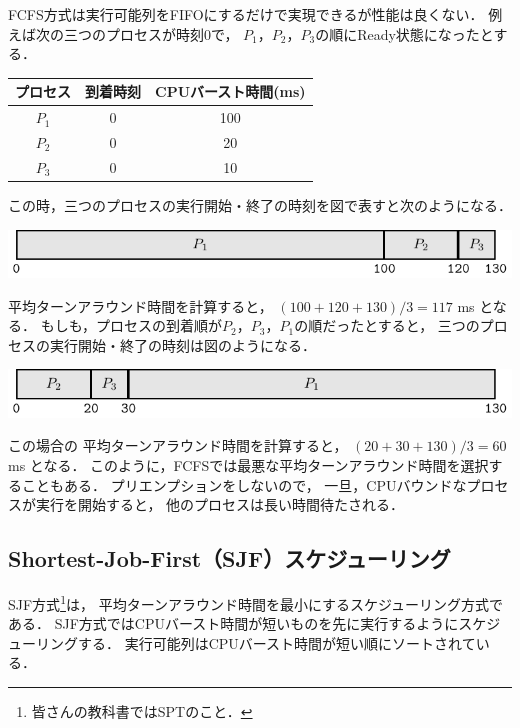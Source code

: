 FCFS方式は実行可能列をFIFOにするだけで実現できるが性能は良くない．
例えば次の三つのプロセスが時刻0で，
$P_1$，$P_2$，$P_3$の順にReady状態になったとする．

\begin{center}
\begin{tabular}{c c c}
プロセス & 到着時刻 & CPUバースト時間(ms) \\
\hline
$P_1$    & 0 & 100 \\
$P_2$    & 0 & 20 \\
$P_3$    & 0 & 10 \\
\end{tabular}
\end{center}

この時，三つのプロセスの実行開始・終了の時刻を図で表すと次のようになる．

\begin{center}
\includegraphics[scale=1.0]{GanntChart/fcfs1.pdf}
\end{center}

平均ターンアラウンド時間を計算すると，
$(100+120+130) / 3 = 117$ ms となる．
もしも，プロセスの到着順が$P_2$，$P_3$，$P_1$の順だったとすると，
三つのプロセスの実行開始・終了の時刻は図のようになる．

\begin{center}
\includegraphics[scale=1.0]{GanntChart/fcfs2.pdf}
\end{center}

この場合の
平均ターンアラウンド時間を計算すると，
$(20+30+130) / 3 = 60$ ms となる．
このように，FCFSでは最悪な平均ターンアラウンド時間を選択することもある．
プリエンプションをしないので，
一旦，CPUバウンドなプロセスが実行を開始すると，
他のプロセスは長い時間待たされる．

\subsection{Shortest-Job-First（SJF）スケジューリング}
SJF方式\footnote{皆さんの教科書ではSPTのこと．}は，
平均ターンアラウンド時間を最小にするスケジューリング方式である．
SJF方式ではCPUバースト時間が短いものを先に実行するようにスケジューリングする．
実行可能列はCPUバースト時間が短い順にソートされている．

